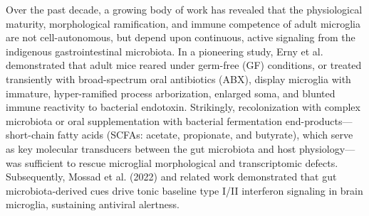 \documentclass[10pt,a4paper]{article}
\begin{document}
Over the past decade, a growing body of work has revealed that the physiological maturity, morphological ramification, and immune competence of adult microglia are not cell-autonomous, but depend upon continuous, active signaling from the indigenous gastrointestinal microbiota\cite{erny2015_6,cryan2019_7}. In a pioneering study, Erny et al. demonstrated that adult mice reared under germ-free (GF) conditions, or treated transiently with broad-spectrum oral antibiotics (ABX), display microglia with immature, hyper-ramified process arborization, enlarged soma, and blunted immune reactivity to bacterial endotoxin\cite{erny2015_6}. Strikingly, recolonization with complex microbiota or oral supplementation with bacterial fermentation end-products---short-chain fatty acids (SCFAs: acetate, propionate, and butyrate), which serve as key molecular transducers between the gut microbiota and host physiology\cite{koh2016_33,smith2013_34,sadler2020_35,sampson2016_36}---was sufficient to rescue microglial morphological and transcriptomic defects\cite{erny2015_6,erny2021_8}. Subsequently, Mossad et al. (2022) and related work demonstrated that gut microbiota-derived cues drive tonic baseline type I/II interferon signaling in brain microglia, sustaining antiviral alertness\cite{mossad2021_9,mossad2022_10}.
\end{document}
